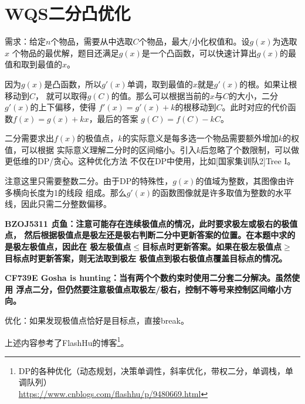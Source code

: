 \section{WQS二分凸优化}
需求：给定$n$个物品，需要从中选取$C$个物品，最大/小化权值和。设$g(x)$为选取$x$
个物品的最优解，题目还满足$g(x)$是一个凸函数，可以快速计算出$g(x)$的最值和取到最值的$x$。

因为$g(x)$是凸函数，所以$g'(x)$单调，取到最值的$x$就是$g'(x)$的根。如果让根移动到$C$，
就可以取得$g(C)$的值。那么可以根据当前的$x$与$C$的大小，二分$g'(x)$的上下偏移，使得
$f'(x)=g'(x)+k$的根移动到$C$。此时对应的代价函数$f(x)=g(x)+kx$，最后的答案
$g(C)=f(C)-kC$。

二分需要求出$f(x)$的极值点，$k$的实际意义是每多选一个物品需要额外增加$k$的权值，可以根据
实际意义理解二分时的区间缩小。引入$k$后忽略了个数限制，可以做更低维的DP/贪心。这种优化方法
不仅在DP中使用，比如[国家集训队2]Tree I。

注意这里只需要整数二分。由于DP的特殊性，$g(x)$的值域为整数，其图像由许多横向长度为1的线段
组成。那么$g'(x)$的函数图像就是许多取值为整数的水平线，因此只需二分整数偏移。

{\bfseries BZOJ5311 贞鱼：注意可能存在连续极值点的情况，此时要求极左或极右的极值点，
然后根据极值点是极左还是极右判断二分中更新答案的位置。在本题中求的是极左极值点，因此在
极左极值点$\leq$目标点时更新答案。如果在极左极值点$\geq$目标点时更新答案，则无法取到极左
极值点到极右极值点覆盖目标点的情况。}

{\bfseries CF739E Gosha is hunting：当有两个个数约束时使用二分套二分解决。虽然使用
浮点二分，但仍然要注意极值点取极左/极右，控制不等号来控制区间缩小方向。}

优化：如果发现极值点恰好是目标点，直接break。

上述内容参考了FlashHu的博客\footnote{
    DP的各种优化（动态规划，决策单调性，斜率优化，带权二分，单调栈，单调队列）\\
    \url{https://www.cnblogs.com/flashhu/p/9480669.html}
}。
